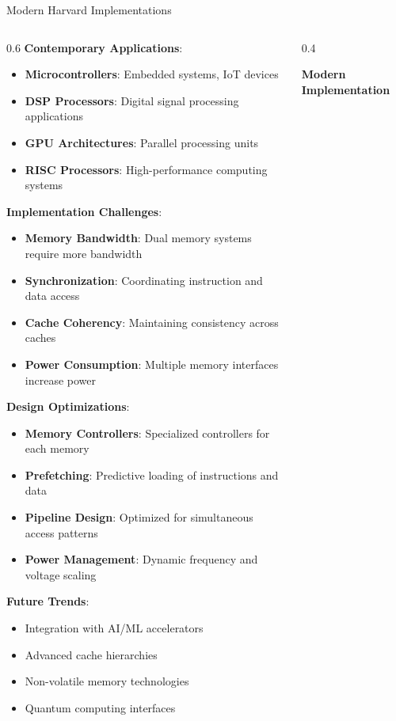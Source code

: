 \documentclass[aspectratio=169]{beamer}
\newcommand{\concept}[1]{\textbf{\color{darkblue}#1}}
\begin{document}
\begin{frame}{Modern Harvard Implementations}
\begin{columns}
\begin{column}{0.6\textwidth}
\concept{Contemporary Applications}:
\begin{itemize}
\item \textbf{Microcontrollers}: Embedded systems, IoT devices
\item \textbf{DSP Processors}: Digital signal processing applications
\item \textbf{GPU Architectures}: Parallel processing units
\item \textbf{RISC Processors}: High-performance computing systems
\end{itemize}

\vspace{0.3cm}
\concept{Implementation Challenges}:
\begin{itemize}
\item \textbf{Memory Bandwidth}: Dual memory systems require more bandwidth
\item \textbf{Synchronization}: Coordinating instruction and data access
\item \textbf{Cache Coherency}: Maintaining consistency across caches
\item \textbf{Power Consumption}: Multiple memory interfaces increase power
\end{itemize}

\vspace{0.3cm}
\concept{Design Optimizations}:
\begin{itemize}
\item \textbf{Memory Controllers}: Specialized controllers for each memory
\item \textbf{Prefetching}: Predictive loading of instructions and data
\item \textbf{Pipeline Design}: Optimized for simultaneous access patterns
\item \textbf{Power Management}: Dynamic frequency and voltage scaling
\end{itemize}

\vspace{0.3cm}
\concept{Future Trends}:
\begin{itemize}
\item Integration with AI/ML accelerators
\item Advanced cache hierarchies
\item Non-volatile memory technologies
\item Quantum computing interfaces
\end{itemize}
\end{column}
\begin{column}{0.4\textwidth}
\begin{center}
\textbf{Modern Implementation}
\vspace{0.3cm}


\end{center}
\end{column}
\end{columns}
\end{frame}
\end{document}
